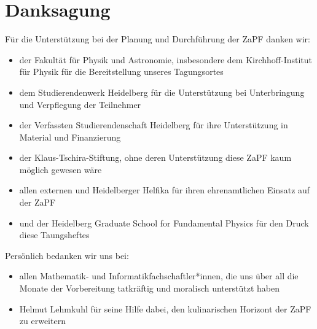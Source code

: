 
\section{Danksagung}
Für die Unterstützung bei der Planung und Durchführung der ZaPF danken wir:
\begin{itemize}
\item der Fakultät für Physik und Astronomie, insbesondere dem Kirchhoff-Institut für Physik für die Bereitstellung unseres Tagungsortes
\item dem Studierendenwerk Heidelberg für die Unterstützung bei Unterbringung und Verpflegung der Teilnehmer
\item der Verfassten Studierendenschaft Heidelberg für ihre Unterstützung in Material und Finanzierung
\item der Klaus-Tschira-Stiftung, ohne deren Unterstützung diese ZaPF kaum möglich gewesen wäre
\item allen externen und Heidelberger Helfika für ihren ehrenamtlichen Einsatz auf der ZaPF
\item und der Heidelberg Graduate School for Fundamental Physics für den Druck diese Taungsheftes
\end{itemize}
 Persönlich bedanken wir uns bei:
 \begin{itemize}
 \item allen Mathematik- und Informatikfachschaftler*innen, die uns über all die Monate der Vorbereitung tatkräftig und moralisch unterstützt haben
 \item Helmut Lehmkuhl für seine Hilfe dabei, den kulinarischen Horizont der ZaPF zu erweitern
 \end{itemize}
 


